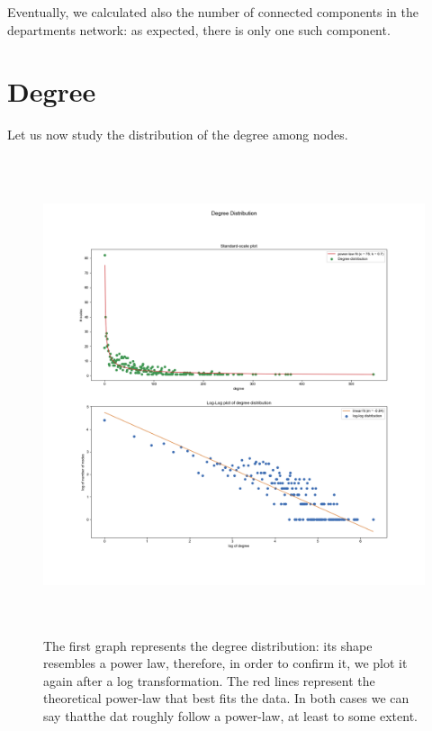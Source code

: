 \documentclass{report}
\theoremstyle{definition}
\theoremstyle{remark}
\begin{document}
Eventually, we calculated also the number of connected components in the departments network: as expected, there is only one such component.
\newpage
\section*{Degree}

Let us now study the distribution of the degree among nodes.


\begin{figure} [H]
	\centering
	\centerline{\includegraphics[width = 18cm, height = 14cm, keepaspectratio]{degree_distribution_fit.png}}
	\label{Degree}
	\caption{The first graph represents the degree distribution: its shape resembles a power law, therefore, in order to confirm it, we plot it again after a log transformation. The red lines represent the theoretical power-law that best fits the data. In both cases we can say thatthe dat roughly follow a power-law, at least to some extent.}
\end{figure}
\end{document}
